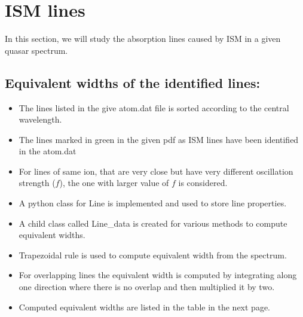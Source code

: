 \documentclass[12pt]{article}
\begin{document}
 

 
 
 
\newpage
 
\section{ISM lines}
In this section, we will study the absorption lines caused by ISM in a given quasar spectrum.

\subsection{Equivalent widths of the identified lines:}
\begin{itemize}
\item {The lines listed in the give atom.dat file is sorted according to the central wavelength.}
\item{The lines marked in green in the given pdf as ISM lines have been identified in the atom.dat}
\item{For lines of same ion, that are very close but have very different oscillation strength ($f$), the one with larger value of $f$ is considered.}
\item{A python class for Line is implemented and used to store line properties.}
\item{A child class called Line\_data is created for various methods to compute equivalent widths.}
\item{Trapezoidal  rule is used to compute equivalent width from the spectrum.}
\item{For overlapping lines the equivalent width is computed by integrating along one direction where there is no overlap and then multiplied it by two.}
\item{Computed equivalent widths are listed in the table in the next page.}%

\end{itemize}

\end{document}
